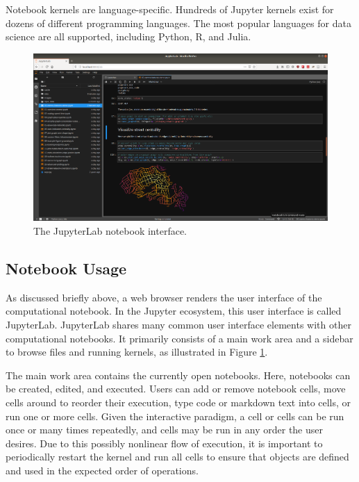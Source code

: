 \documentclass[11pt,letterpaper]{article}
\begin{document}
Notebook kernels are language-specific. Hundreds of Jupyter kernels exist for dozens of different programming languages. The most popular languages for data science are all supported, including Python, R, and Julia.

\begin{figure}[tbp]
	\centering
	\includegraphics[width=1\textwidth]{jupyterlab-interface.png}
	\caption{The JupyterLab notebook interface.}
	\label{fig:jupyterlab_interface}
\end{figure}

\subsection{Notebook Usage}

As discussed briefly above, a web browser renders the user interface of the computational notebook. In the Jupyter ecosystem, this user interface is called JupyterLab. JupyterLab shares many common user interface elements with other computational notebooks. It primarily consists of a main work area and a sidebar to browse files and running kernels, as illustrated in Figure \ref{fig:jupyterlab_interface}. 

The main work area contains the currently open notebooks. Here, notebooks can be created, edited, and executed. Users can add or remove notebook cells, move cells around to reorder their execution, type code or markdown text into cells, or run one or more cells. Given the interactive paradigm, a cell or cells can be run once or many times repeatedly, and cells may be run in any order the user desires. Due to this possibly nonlinear flow of execution, it is important to periodically restart the kernel and run all cells to ensure that objects are defined and used in the expected order of operations.
\end{document}
